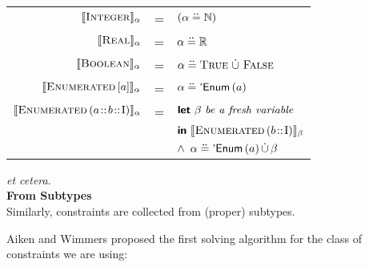 \documentclass[12pt]{article}
\begin{document}
\begin{slide}
\begin{tabular}{rcl}
$\llbracket{\textsc{Integer}}\rrbracket_{\alpha}$
  & = & $(\alpha \stackrel{\pmb{..}}{=} \mathbb{N})$\\ 
$\llbracket{\textsc{Real}}\rrbracket_{\alpha}$
  & = & $\alpha \stackrel{\pmb{..}}{=} \mathbb{R}$\\ 
$\llbracket{\textsc{Boolean}}\rrbracket_{\alpha}$
  & = & $\alpha \stackrel{\pmb{..}}{=} \textsc{True} \,\, \dot{\cup} \,\, \textsc{False}$\\
$\llbracket{\textsc{Enumerated}\, [a]}\rrbracket_{\alpha}$
  & = & $\alpha \stackrel{\pmb{..}}{=} \textnormal{\textsf{`Enum}} \, (a)$\\
$\llbracket{\textsc{Enumerated}\, (a \!::\!b \!::\!\textnormal{I})}\rrbracket_{\alpha}$
  & = & $\textnormal{\textsf{\textbf{let}}} \,\, \beta \,\, \textnormal{\emph{be a fresh
         variable}}$\\
  &   & $\textnormal{\textsf{\textbf{in}}} \,\, \llbracket{\textsc{Enumerated}\, (b \!::\!\textnormal{I})}\rrbracket_{\beta}$ \\
  &   & \hspace*{8mm}
        $\wedge \,\,\,  \alpha \stackrel{\pmb{..}}{=} \textnormal{\textsf{`Enum}} \, (a) \, \dot{\cup} \, \beta$\\
\end{tabular}

\bigskip

\emph{et cetera}. \\


\textbf{From Subtypes}\\

Similarly, constraints are collected from (proper) subtypes.


\pagebreak


Aiken and Wimmers proposed the first solving algorithm for the class
of constraints we are using: \\



\nocite*{}

\end{slide}
\end{document}
